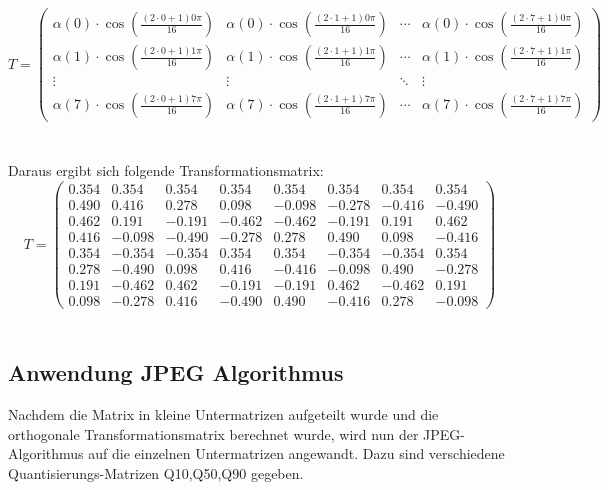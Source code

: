 \documentclass[12pt]{article}
\begin{document}
		
		\[
		T = \left( \begin{array}{cccccccc}
			\alpha(0) \cdot \cos\left(\frac{(2\cdot0+1)0\pi}{16}\right) & \alpha(0) \cdot \cos\left(\frac{(2\cdot1+1)0\pi}{16}\right) & \cdots & \alpha(0) \cdot \cos\left(\frac{(2\cdot7+1)0\pi}{16}\right) \\
			\alpha(1) \cdot \cos\left(\frac{(2\cdot0+1)1\pi}{16}\right) & \alpha(1) \cdot \cos\left(\frac{(2\cdot1+1)1\pi}{16}\right) & \cdots & \alpha(1) \cdot \cos\left(\frac{(2\cdot7+1)1\pi}{16}\right) \\
			\vdots & \vdots & \ddots & \vdots \\
			\alpha(7) \cdot \cos\left(\frac{(2\cdot0+1)7\pi}{16}\right) & \alpha(7) \cdot \cos\left(\frac{(2\cdot1+1)7\pi}{16}\right) & \cdots & \alpha(7) \cdot \cos\left(\frac{(2\cdot7+1)7\pi}{16}\right)
		\end{array} \right)
		\]
		\\\\
		Daraus ergibt sich folgende Transformationsmatrix: \\
	\[
	T = \left( \begin{array}{cccccccc}
			0.354 & 0.354 & 0.354 & 0.354 & 0.354 & 0.354 & 0.354 & 0.354 \\
			0.490 & 0.416 & 0.278 & 0.098 & -0.098 & -0.278 & -0.416 & -0.490 \\
			0.462 & 0.191 & -0.191 & -0.462 & -0.462 & -0.191 & 0.191 & 0.462 \\
			0.416 & -0.098 & -0.490 & -0.278 & 0.278 & 0.490 & 0.098 & -0.416 \\
			0.354 & -0.354 & -0.354 & 0.354 & 0.354 & -0.354 & -0.354 & 0.354 \\
			0.278 & -0.490 & 0.098 & 0.416 & -0.416 & -0.098 & 0.490 & -0.278 \\
			0.191 & -0.462 & 0.462 & -0.191 & -0.191 & 0.462 & -0.462 & 0.191 \\
			0.098 & -0.278 & 0.416 & -0.490 & 0.490 & -0.416 & 0.278 & -0.098
	\end{array} \right)
\]
		\\
		
	
	
	
		\subsection{Anwendung JPEG Algorithmus}
Nachdem die Matrix in kleine Untermatrizen aufgeteilt wurde und die orthogonale Transformationsmatrix berechnet wurde, wird nun der JPEG-Algorithmus auf die einzelnen Untermatrizen angewandt.
Dazu sind verschiedene Quantisierungs-Matrizen Q10,Q50,Q90 gegeben.
\end{document}
